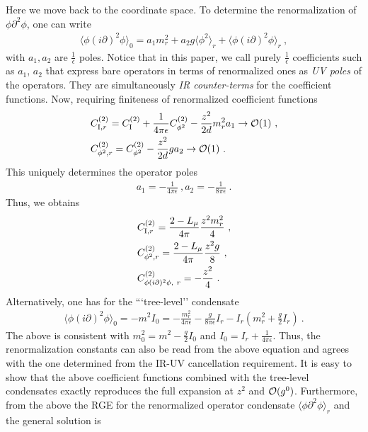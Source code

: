 \documentclass[a4paper,11pt]{article}
\begin{document}
Here we move back to the coordinate space. To determine the renormalization of $\phi \partial^2\phi$, one can write 
\begin{align} \label{eq:tree1bare}
\langle \phi (i\partial)^2\phi\rangle_0=a_1m_r^2+a_2g\langle\phi^2\rangle_r +\langle \phi (i\partial)^2 \phi\rangle_r \ ,
\end{align}
with $a_1, a_2$ are $\frac{1}{\epsilon}$ poles. Notice that in this paper, we call purely $\frac{1}{\epsilon}$ coefficients such as $a_1$, $a_2$ that express bare operators in terms of renormalized ones as {\it UV poles} of the operators. They are simultaneously {\it IR counter-terms} for the coefficient functions.  Now, requiring finiteness of renormalized coefficient functions
\begin{align}
& C_{{\rm I},r}^{(2)}=C_{\rm I}^{(2)}+\frac{1}{4\pi \epsilon}C_{\phi^2}^{(2)}-\frac{z^2}{2d}m_r^2a_1 \rightarrow {\cal O}(1) \ , \\
& C_{\phi^2,r}^{(2)}=C_{\phi^2}^{(2)}-\frac{z^2}{2d}ga_2 \rightarrow{\cal O}(1) \ .
\end{align}
This uniquely determines the operator poles
\begin{align} \label{eq:constants2}
a_1=-\frac{1}{4\pi\epsilon} \ , a_2=-\frac{1}{8\pi \epsilon} \ .
\end{align}
Thus, we obtains 
\begin{align}
& C_{{\rm I},r}^{(2)}=\frac{2-L_\mu}{4\pi}\frac{z^2m_r^2}{4} \ , \\
& C_{\phi^2,r}^{(2)}=\frac{2-L_\mu}{4\pi}\frac{z^2g}{8} \ , \\
& C_{\phi(i\partial)^2\phi,\ r}^{(2)}=-\frac{z^2}{4} \ .
\end{align}
Alternatively, one has for the ```tree-level'' condensate
\begin{align}
\langle \phi (i\partial)^2\phi\rangle_0=-m^2I_0=-\frac{m_r^2}{4\pi \epsilon}-\frac{g}{8\pi\epsilon}I_r-I_r\left(m_r^2+\frac{g}{2}I_r\right) \ .
\end{align}
The above is consistent with $m_0^2=m^2-\frac{g}{2}I_0$ and $I_0=I_r+\frac{1}{4\pi \epsilon}$. Thus, the renormalization constants can also be read from the above equation and agrees with the one determined from the IR-UV cancellation requirement. It is easy to show that the above coefficient functions combined with the tree-level condensates exactly reproduces the full expansion at $z^2$ and ${\cal O}(g^0)$. 
Furthermore, from the above the RGE for the renormalized operator condensate $\langle\phi\partial^2\phi\rangle_r$ and the general solution is 
\end{document}
